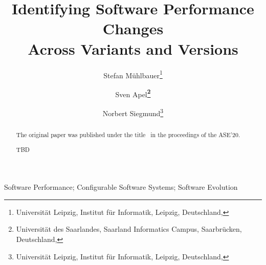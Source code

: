 \documentclass[utf8,biblatex]{lni}
\begin{document}
\title[Identifying Software Performance Changes Across Variants and Versions]{Identifying Software Performance Changes\\ Across Variants and Versions}
\author[Stefan Mühlbauer \and Sven Apel \and Norbert Siegmund]
{Stefan Mühlbauer\footnote{Universität Leipzig, Institut für Informatik, Leipzig, Deutschland, } \and
Sven Apel\textbf{\footnote{Universität des Saarlandes, Saarland Informatics Campus, Saarbrücken, Deutschland, }} \and
Norbert Siegmund\footnote{Universität Leipzig, Institut für Informatik, Leipzig, Deutschland, }
}
\maketitle

\begin{abstract}
The original paper was published under the title~ in the proceedings of the ASE'20.

TBD~\cite{muhlbauer_accurate_2019,muehlbauer_identifying_2020}
\end{abstract}

\begin{keywords}
Software Performance; Configurable Software Systems; Software Evolution
\end{keywords}



\printbibliography
\end{document}
